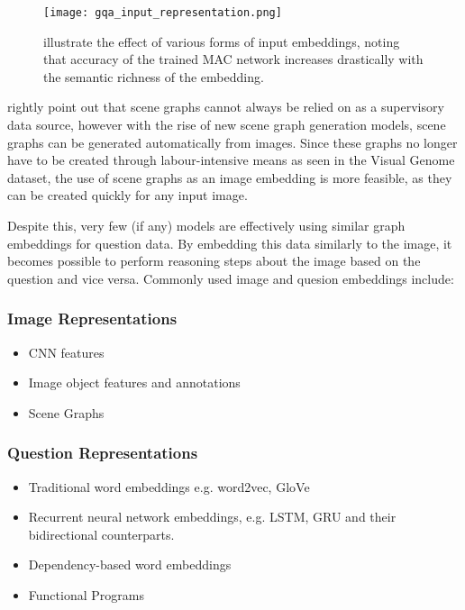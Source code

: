 \begin{figure}[H]
    \centering
    \texttt{[image: gqa\_input\_representation.png]}
    \caption{\citeauthor{hudson2019gqa_preprint} illustrate the effect of various forms of input embeddings, noting that accuracy of the trained MAC network \cite{hudson2018compositional} increases drastically with the semantic richness of the embedding.}
    \label{fig:gqa_input_representation}
\end{figure}

\citeauthor{hudson2018compositional} rightly point out that scene graphs cannot always be relied on as a supervisory data source, however with the rise of new scene graph generation models, scene graphs can be generated automatically from images. Since these graphs no longer have to be created through labour-intensive means as seen in the Visual Genome dataset, the use of scene graphs as an image embedding is more feasible, as they can be created quickly for any input image.

\vspace{\baselineskip}

Despite this, very few (if any) models are effectively using similar graph embeddings for question data. By embedding this data similarly to the image, it becomes possible to perform reasoning steps about the image based on the question and vice versa. Commonly used image and quesion embeddings include:

\subsubsection*{Image Representations}

\begin{itemize}
    \item CNN features
    \item Image object features and annotations
    \item Scene Graphs
\end{itemize}

\subsubsection*{Question Representations}

\begin{itemize}
    \item Traditional word embeddings e.g. word2vec, GloVe
    \item Recurrent neural network embeddings, e.g. LSTM, GRU and their bidirectional counterparts. 
    \item Dependency-based word embeddings \cite{levy2014dependency}
    \item Functional Programs
\end{itemize}


